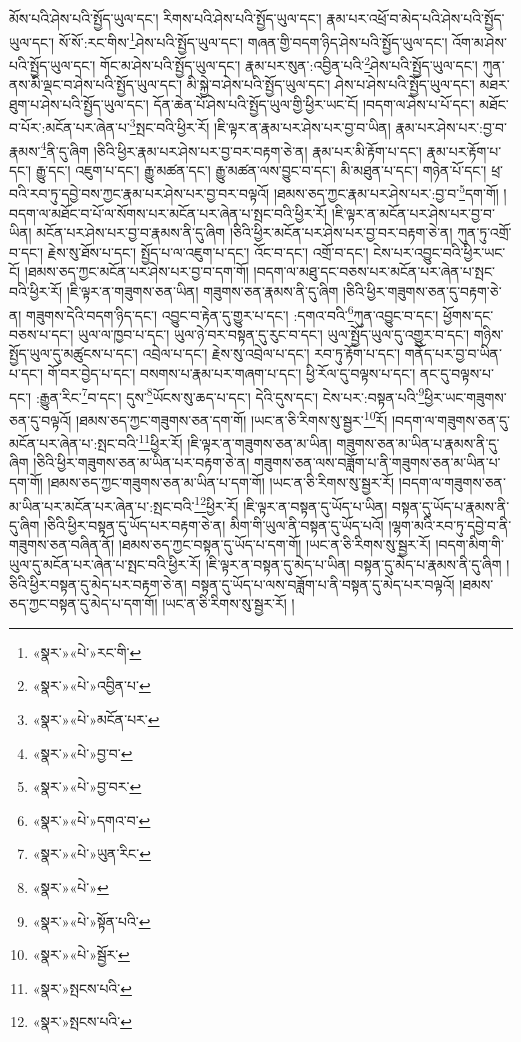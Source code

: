 མོས་པའི་ཤེས་པའི་སྤྱོད་ཡུལ་དང་། རིགས་པའི་ཤེས་པའི་སྤྱོད་ཡུལ་དང་། རྣམ་པར་འཕྲོ་བ་མེད་པའི་ཤེས་པའི་སྤྱོད་ཡུལ་དང་། སོ་སོ་:རང་གིས་\footnote{«སྣར་»«པེ་»རང་གི་}ཤེས་པའི་སྤྱོད་ཡུལ་དང་། གཞན་གྱི་བདག་ཉིད་ཤེས་པའི་སྤྱོད་ཡུལ་དང་། འོག་མ་ཤེས་པའི་སྤྱོད་ཡུལ་དང་། གོང་མ་ཤེས་པའི་སྤྱོད་ཡུལ་དང་། རྣམ་པར་སུན་:འབྱིན་པའི་\footnote{«སྣར་»«པེ་»འབྱིན་པ་}ཤེས་པའི་སྤྱོད་ཡུལ་དང་། ཀུན་ནས་མི་ལྡང་བ་ཤེས་པའི་སྤྱོད་ཡུལ་དང་། མི་སྐྱེ་བ་ཤེས་པའི་སྤྱོད་ཡུལ་དང་། ཤེས་པ་ཤེས་པའི་སྤྱོད་ཡུལ་དང་། མཐར་ཐུག་པ་ཤེས་པའི་སྤྱོད་ཡུལ་དང་། དོན་ཆེན་པོ་ཤེས་པའི་སྤྱོད་ཡུལ་གྱི་ཕྱིར་ཡང་ངོ། །བདག་ལ་ཤེས་པ་པོ་དང་། མཐོང་བ་པོར་:མངོན་པར་ཞེན་པ་\footnote{«སྣར་»«པེ་»མངོན་པར་}སྤང་བའི་ཕྱིར་རོ། །ཇི་ལྟར་ན་རྣམ་པར་ཤེས་པར་བྱ་བ་ཡིན། རྣམ་པར་ཤེས་པར་:བྱ་བ་རྣམས་\footnote{«སྣར་»«པེ་»བྱ་བ་}ནི་དུ་ཞིག །ཅིའི་ཕྱིར་རྣམ་པར་ཤེས་པར་བྱ་བར་བརྟག་ཅེ་ན། རྣམ་པར་མི་རྟོག་པ་དང་། རྣམ་པར་རྟོག་པ་དང་། རྒྱུ་དང་། འཇུག་པ་དང་། རྒྱུ་མཚན་དང་། རྒྱུ་མཚན་ལས་བྱུང་བ་དང་། མི་མཐུན་པ་དང་། གཉེན་པོ་དང་། ཕྲ་བའི་རབ་ཏུ་དབྱེ་བས་ཀྱང་རྣམ་པར་ཤེས་པར་བྱ་བར་བལྟའོ། །ཐམས་ཅད་ཀྱང་རྣམ་པར་ཤེས་པར་:བྱ་བ་\footnote{«སྣར་»«པེ་»བྱ་བར་}དག་གོ། །བདག་ལ་མཐོང་བ་པོ་ལ་སོགས་པར་མངོན་པར་ཞེན་པ་སྤང་བའི་ཕྱིར་རོ། །ཇི་ལྟར་ན་མངོན་པར་ཤེས་པར་བྱ་བ་ཡིན། མངོན་པར་ཤེས་པར་བྱ་བ་རྣམས་ནི་དུ་ཞིག །ཅིའི་ཕྱིར་མངོན་པར་ཤེས་པར་བྱ་བར་བརྟག་ཅེ་ན། ཀུན་ཏུ་འགྲོ་བ་དང་། རྗེས་སུ་ཐོས་པ་དང་། སྤྱོད་པ་ལ་འཇུག་པ་དང་། འོང་བ་དང་། འགྲོ་བ་དང་། ངེས་པར་འབྱུང་བའི་ཕྱིར་ཡང་ངོ། །ཐམས་ཅད་ཀྱང་མངོན་པར་ཤེས་པར་བྱ་བ་དག་གོ། །བདག་ལ་མཐུ་དང་བཅས་པར་མངོན་པར་ཞེན་པ་སྤང་བའི་ཕྱིར་རོ། །ཇི་ལྟར་ན་གཟུགས་ཅན་ཡིན། གཟུགས་ཅན་རྣམས་ནི་དུ་ཞིག །ཅིའི་ཕྱིར་གཟུགས་ཅན་དུ་བརྟག་ཅེ་ན། གཟུགས་དེའི་བདག་ཉིད་དང་། འབྱུང་བ་རྟེན་དུ་གྱུར་པ་དང་། :དགའ་བའི་\footnote{«སྣར་»«པེ་»དགའ་བ་}ཀུན་འབྱུང་བ་དང་། ཕྱོགས་དང་བཅས་པ་དང་། ཡུལ་ལ་ཁྱབ་པ་དང་། ཡུལ་ཉེ་བར་བསྟན་དུ་རུང་བ་དང་། ཡུལ་སྤྱོད་ཡུལ་དུ་འགྱུར་བ་དང་། གཉིས་སྤྱོད་ཡུལ་དུ་མཚུངས་པ་དང་། འབྲེལ་པ་དང་། རྗེས་སུ་འབྲེལ་པ་དང་། རབ་ཏུ་རྟོག་པ་དང་། གནོད་པར་བྱ་བ་ཡིན་པ་དང་། གོ་བར་བྱེད་པ་དང་། བསགས་པ་རྣམ་པར་གཞག་པ་དང་། ཕྱི་རོལ་དུ་བལྟས་པ་དང་། ནང་དུ་བལྟས་པ་དང་། :རྒྱུན་རིང་\footnote{«སྣར་»«པེ་»ཡུན་རིང་}བ་དང་། དུས་\footnote{«སྣར་»«པེ་»}ཡོངས་སུ་ཆད་པ་དང་། དེའི་དུས་དང་། ངེས་པར་:བསྟན་པའི་\footnote{«སྣར་»«པེ་»སྟོན་པའི་}ཕྱིར་ཡང་གཟུགས་ཅན་དུ་བལྟའོ། །ཐམས་ཅད་ཀྱང་གཟུགས་ཅན་དག་གོ། །ཡང་ན་ཅི་རིགས་སུ་སྦྱར་\footnote{«སྣར་»«པེ་»སྦྱོར་}རོ། །བདག་ལ་གཟུགས་ཅན་དུ་མངོན་པར་ཞེན་པ་:སྤང་བའི་\footnote{«སྣར་»སྤངས་པའི་}ཕྱིར་རོ། །ཇི་ལྟར་ན་གཟུགས་ཅན་མ་ཡིན། གཟུགས་ཅན་མ་ཡིན་པ་རྣམས་ནི་དུ་ཞིག །ཅིའི་ཕྱིར་གཟུགས་ཅན་མ་ཡིན་པར་བརྟག་ཅེ་ན། གཟུགས་ཅན་ལས་བཟློག་པ་ནི་གཟུགས་ཅན་མ་ཡིན་པ་དག་གོ། །ཐམས་ཅད་ཀྱང་གཟུགས་ཅན་མ་ཡིན་པ་དག་གོ། །ཡང་ན་ཅི་རིགས་སུ་སྦྱར་རོ། །བདག་ལ་གཟུགས་ཅན་མ་ཡིན་པར་མངོན་པར་ཞེན་པ་:སྤང་བའི་\footnote{«སྣར་»སྤངས་པའི་}ཕྱིར་རོ། །ཇི་ལྟར་ན་བསྟན་དུ་ཡོད་པ་ཡིན། བསྟན་དུ་ཡོད་པ་རྣམས་ནི་དུ་ཞིག །ཅིའི་ཕྱིར་བསྟན་དུ་ཡོད་པར་བརྟག་ཅེ་ན། མིག་གི་ཡུལ་ནི་བསྟན་དུ་ཡོད་པའོ། །ལྷག་མའི་རབ་ཏུ་དབྱེ་བ་ནི་གཟུགས་ཅན་བཞིན་ནོ། །ཐམས་ཅད་ཀྱང་བསྟན་དུ་ཡོད་པ་དག་གོ། །ཡང་ན་ཅི་རིགས་སུ་སྦྱར་རོ། །བདག་མིག་གི་ཡུལ་དུ་མངོན་པར་ཞེན་པ་སྤང་བའི་ཕྱིར་རོ། །ཇི་ལྟར་ན་བསྟན་དུ་མེད་པ་ཡིན། བསྟན་དུ་མེད་པ་རྣམས་ནི་དུ་ཞིག །ཅིའི་ཕྱིར་བསྟན་དུ་མེད་པར་བརྟག་ཅེ་ན། བསྟན་དུ་ཡོད་པ་ལས་བཟློག་པ་ནི་བསྟན་དུ་མེད་པར་བལྟའོ། །ཐམས་ཅད་ཀྱང་བསྟན་དུ་མེད་པ་དག་གོ། །ཡང་ན་ཅི་རིགས་སུ་སྦྱར་རོ། །
